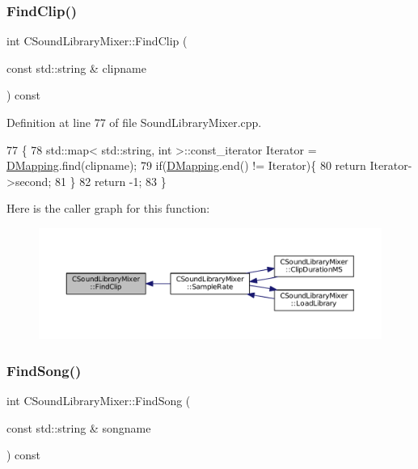 \subsubsection{\texorpdfstring{Find\+Clip()}{FindClip()}}
{\footnotesize\ttfamily int C\+Sound\+Library\+Mixer\+::\+Find\+Clip (\begin{DoxyParamCaption}\item[{const std\+::string \&}]{clipname }\end{DoxyParamCaption}) const}



Definition at line 77 of file Sound\+Library\+Mixer.\+cpp.


\begin{DoxyCode}
77                                                                \{
78     std::map< std::string, int >::const\_iterator Iterator = \hyperlink{classCSoundLibraryMixer_a8f193156cafc61b64f04ed88dcabd27d}{DMapping}.find(clipname);
79     \textcolor{keywordflow}{if}(\hyperlink{classCSoundLibraryMixer_a8f193156cafc61b64f04ed88dcabd27d}{DMapping}.end() != Iterator)\{
80         \textcolor{keywordflow}{return} Iterator->second;
81     \}
82     \textcolor{keywordflow}{return} -1;
83 \}
\end{DoxyCode}
Here is the caller graph for this function\+:
\nopagebreak
\begin{figure}[H]
\begin{center}
\leavevmode
\includegraphics[width=350pt]{classCSoundLibraryMixer_ad8cc956bda999fe677e92f7392834b7a_icgraph}
\end{center}
\end{figure}
\hypertarget{classCSoundLibraryMixer_a67d0364979fab26c2b2467357ec03696}{}\label{classCSoundLibraryMixer_a67d0364979fab26c2b2467357ec03696} 
\subsubsection{\texorpdfstring{Find\+Song()}{FindSong()}}
{\footnotesize\ttfamily int C\+Sound\+Library\+Mixer\+::\+Find\+Song (\begin{DoxyParamCaption}\item[{const std\+::string \&}]{songname }\end{DoxyParamCaption}) const}




